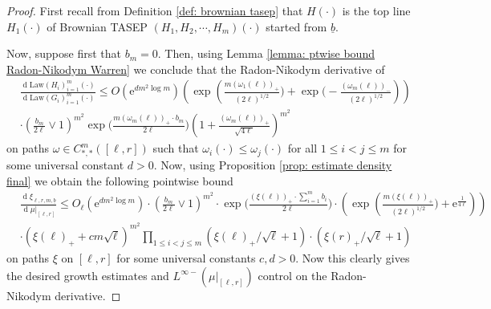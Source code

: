 \documentclass[11pt, reqno]{amsart}
\numberwithin{equation}{section}
\newcommand{\diff}{\ensuremath{\operatorname{d}\!}}
\begin{document}
\begin{proof}

     First recall from Definition \ref{def: brownian tasep} that $H(\cdot)$ is the top line $H_1(\cdot)$ of Brownian TASEP $(H_1, H_2, \cdots, H_m)(\cdot)$ started from $\underline{b}$.
     
     Now, suppose first that $b_m = 0$. Then, using Lemma \ref{lemma: ptwise bound Radon-Nikodym  Warren} we conclude that the Radon-Nikodym  derivative of 
\begin{equation*}
    \begin{array}{cc}
         & \frac{\diff \mathrm{Law}(H_i)_{i =1}^m(\cdot)}{\diff\mathrm{Law}(G_i)_{i =1}^m(\cdot)}\le O(\mathrm{e}^{dm^2\log m})\left( \exp\left(\frac{m(\omega_1(\ell))_+}{(2\ell)^{1/2}}\big)+\exp\big(-\frac{(\omega_m(\ell))_-}{(2\ell)^{1/2}}\right)\right)\\
        & \cdot\left(\frac{b_m}{2\ell}\lor 1\right)^{m^2}\exp\big(\frac{m(\omega_m(\ell))_+ \cdot b_m}{2\ell}\big)\left( 1 + \frac{(\omega_m(\ell))_+}{\sqrt{4\ell}}\right)^{m^2}
    \end{array}
\end{equation*}
on paths $\omega\in C^{m}_{*,*}([\ell,r])$ such that $\omega_{i}(\cdot) \le \omega_j (\cdot)$ for all $1\le i < j\le m$ for some universal constant $d> 0$. Now, using Proposition \ref{prop: estimate density final} we obtain the following pointwise bound
    \begin{equation*}
        \begin{array}{cc}
             & \frac{\diff \xi_{\ell, r, m, \underline{b}}}{\diff\mu\vert_{[\ell, r]}} \le  O_\ell(\mathrm{e}^{dm^2\log m})\cdot\left(\frac{b_m}{2\ell}\lor 1\right)^{m^2}\cdot \exp\big(\frac{(\xi(\ell))_+ \cdot \sum_{i=1}^m b_i}{2\ell}\big)\cdot\left( \exp\left(\frac{m(\xi(\ell))_+}{(2\ell)^{1/2}}\big)+\mathrm{e}^{\frac{1}{4\ell}}\right)\right)\\
             & \cdot (\xi(\ell)_++ cm\sqrt{\ell})^{m^2}\prod_{1\le i < j\le m}(\xi(\ell)_+/\sqrt{\ell}+1)\cdot (\xi(r)_+/\sqrt{\ell}+1)
        \end{array}
    \end{equation*}
    on paths $\xi$ on $[\ell, r]$ for some universal constants $c, d> 0$. Now this clearly gives the desired growth estimates and $L^{\infty-}(\mu\vert_{[\ell, r]})$ control on the Radon-Nikodym  derivative.


\end{proof}
\end{document}
